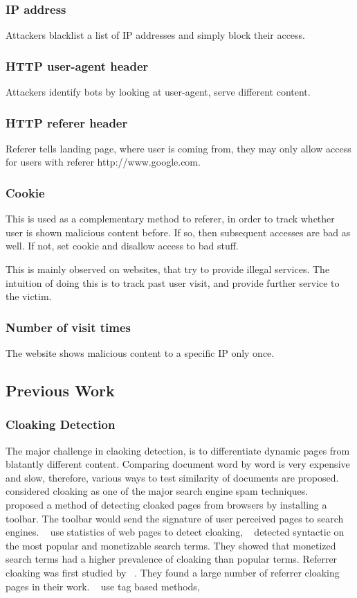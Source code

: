 \subsubsection{IP address}
Attackers blacklist a list of IP addresses and simply block their access.
\subsubsection{HTTP user-agent header}
Attackers identify bots by looking at user-agent, serve different content.
\subsubsection{HTTP referer header}
Referer tells landing page, where user is coming from, they may only allow
access for users with referer http://www.google.com.
\subsubsection{Cookie}
This is used as a complementary method to referer, in order to track whether
user is shown malicious content before. If so, then subsequent accesses are
bad as well. If not, set cookie and disallow access to bad stuff.

This is mainly observed on websites, that try to provide illegal services. The
intuition of doing this is to track past user visit, and provide further service
to the victim.
\subsubsection{Number of visit times}
The website shows malicious content to a specific IP only once.

\subsection{Previous Work}
\subsubsection{Cloaking Detection}
The major challenge in claoking detection, is to differentiate dynamic pages
from blatantly different content.
Comparing document word by word is very expensive and slow, therefore, 
various ways to test similarity of documents are proposed. 
~\cite{henzinger2002challenges}
 considered cloaking as one of the major search engine spam
techniques.
 ~\cite{najork2005system} proposed a method of detecting cloaked pages from browsers by
 installing a toolbar. The toolbar would send the signature of user perceived
 pages to search engines.
 ~\cite{wu2006detecting} use statistics of web pages to detect cloaking,
~\cite{chellapilla2006improving} detected syntactic on the most popular and
 monetizable search terms. They showed that monetized search terms had a higher
 prevalence of cloaking than popular terms.
 Referrer cloaking was first studied by ~\cite{wang2006detecting}. They found
 a large number of referrer cloaking pages in their work.
 ~\cite{lin2009detection} use tag based methods,

